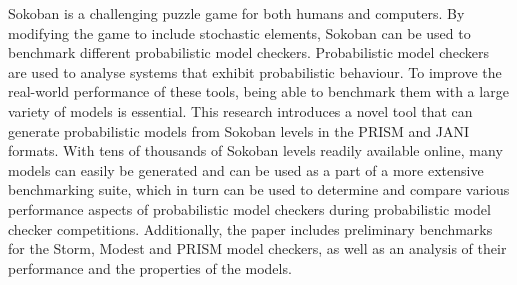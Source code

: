 Sokoban is a challenging puzzle game for both humans and computers. By modifying the game to include stochastic elements, Sokoban can be used to benchmark different probabilistic model checkers. Probabilistic model checkers are used to analyse systems that exhibit probabilistic behaviour. To improve the real-world performance of these tools, being able to benchmark them with a large variety of models is essential. This research introduces a novel tool that can generate probabilistic models from Sokoban levels in the PRISM and JANI formats. With tens of thousands of Sokoban levels readily available online, many models can easily be generated and can be used as a part of a more extensive benchmarking suite, which in turn can be used to determine and compare various performance aspects of probabilistic model checkers during probabilistic model checker competitions. Additionally, the paper includes preliminary benchmarks for the Storm, Modest and PRISM model checkers, as well as an analysis of their performance and the properties of the models. 